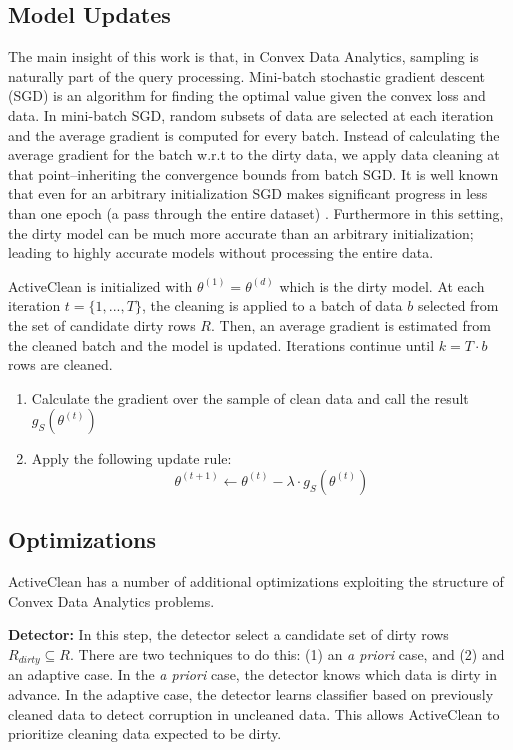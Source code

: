 \subsection{Model Updates}
The main insight of this work is that, in Convex Data Analytics, sampling is naturally part of the query processing.
Mini-batch stochastic gradient descent (SGD) is an algorithm for finding the optimal value
given the convex loss and data.
In mini-batch SGD, random subsets of data are selected at each iteration and the average gradient is computed for every batch.
Instead of calculating the average gradient for the batch w.r.t to the dirty data, we apply data cleaning at that point--inheriting the convergence bounds from batch SGD.
It is well known that even for an arbitrary initialization SGD makes significant progress in less than one epoch (a pass through the entire dataset) \cite{bottou2012stochastic}.
Furthermore in this setting, the dirty model can be much more accurate than an arbitrary initialization; leading to highly accurate models without processing the entire data.

ActiveClean is initialized with $\theta^{(1)} = \theta^{(d)}$ which is the dirty model.
At each iteration $t=\{1,...,T\}$, the cleaning is applied to a batch of data $b$ selected from the set of candidate dirty rows $R$.
Then, an average gradient is estimated from the cleaned batch and the model is updated.
Iterations continue until $k = T \cdot b$ rows are cleaned.

\begin{enumerate}[noitemsep]
	\item Calculate the gradient over the sample of clean data and call the result $g_S(\theta^{(t)})$
	\item Apply the following update rule:
	\[
	\theta^{(t+1)} \leftarrow \theta^{(t)} - \lambda \cdot g_S(\theta^{(t)}) 
	\]
\end{enumerate} 

\subsection{Optimizations}
ActiveClean has a number of additional optimizations exploiting the structure of Convex Data Analytics problems.

\noindent\textbf{Detector: } In this step, the detector select a candidate set of dirty rows $R_{dirty} \subseteq R$. There are two techniques to do this: (1) an \emph{a priori} case, and (2) and an adaptive case. In the \emph{a priori} case, the detector knows which data is dirty in advance. In the adaptive case, the detector learns classifier based on previously cleaned data to detect corruption in uncleaned data. This allows ActiveClean to prioritize cleaning data expected to be dirty. 

